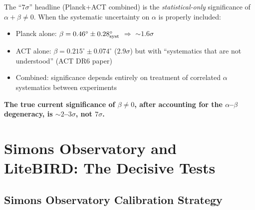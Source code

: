 \documentclass[11pt]{article}
\begin{document}
\begin{tcolorbox}[colback=yellow!5!white, colframe=yellow!60!black,
  title=\textbf{CRITICAL ASSESSMENT}]
The ``$7\sigma$'' headline (Planck+ACT combined) is the
\emph{statistical-only} significance of $\alpha + \beta \neq 0$.
When the systematic uncertainty on $\alpha$ is properly included:
\begin{itemize}
\item Planck alone: $\beta = 0.46^\circ \pm 0.28^\circ_{\rm syst}$
  $\Rightarrow$ $\sim 1.6\sigma$
\item ACT alone: $\beta = 0.215^\circ \pm 0.074^\circ$ ($2.9\sigma$)
  but with ``systematics that are not understood'' (ACT DR6 paper)
\item Combined: significance depends entirely on treatment of
  correlated $\alpha$ systematics between experiments
\end{itemize}
\textbf{The true current significance of $\beta \neq 0$, after
accounting for the $\alpha$--$\beta$ degeneracy, is $\sim 2$--$3\sigma$,
not $7\sigma$.}
\end{tcolorbox}


\section{Simons Observatory and LiteBIRD: The Decisive Tests}
\label{sec:SO}

\subsection{Simons Observatory Calibration Strategy}
\end{document}
